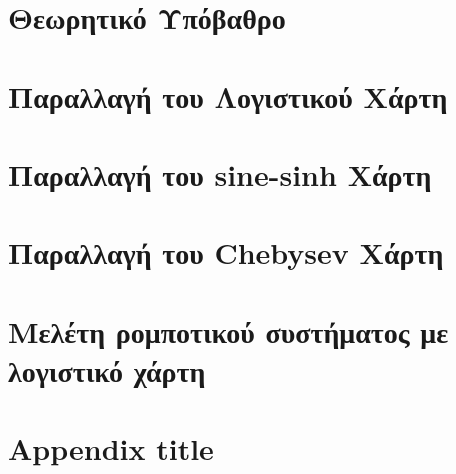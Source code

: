 \documentclass[a4paper,11pt]{report}
\begin{document}


\tableofcontents

\clearpage

\listoffigures
\listoftables
\newpage
{}

\chapter{Θεωρητικό Υπόβαθρο}


\chapter{Παραλλαγή του Λογιστικού Χάρτη}
\label{chap:kef2}


\chapter{Παραλλαγή του sine-sinh Χάρτη}


\chapter{Παραλλαγή του Chebysev Χάρτη}


\chapter{Μελέτη ρομποτικού συστήματος με λογιστικό χάρτη}


\appendix

\chapter{Appendix title}

\end{document}

